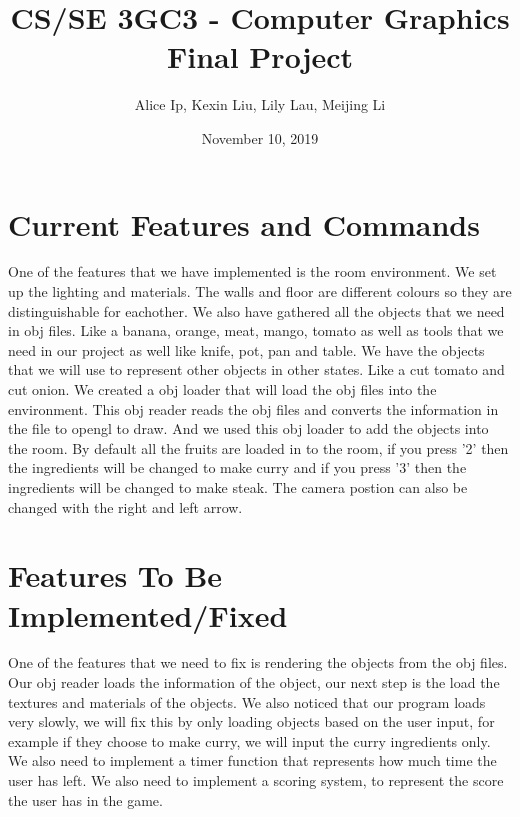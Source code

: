 \documentclass[11pt]{article}
\author{Alice Ip, Kexin Liu, Lily Lau, Meijing Li}
\date{November 10, 2019}
\title{CS/SE 3GC3 - Computer Graphics Final Project}
\begin{document}
\maketitle

\section*{Current Features and Commands}
\label{sec-1}
One of the features that we have implemented is the room environment. 
We set up the lighting and materials. The walls and floor are different colours so they are distinguishable for eachother.
We also have gathered all the objects that we need in obj files. Like a banana, orange, meat, mango, tomato as well as tools that we need in our project as well like knife, pot, pan and table.
We have the objects that we will use to represent other objects in other states. Like a cut tomato and cut onion.   
We created a obj loader that will load the obj files into the environment. This obj reader reads the obj files and converts the information in the file to opengl to draw. And we used this obj loader to add the objects into the room. 
By default all the fruits are loaded in to the room, if you press '2' then the ingredients will be changed to make curry and if you press '3' then the ingredients will be changed to make steak. 
The camera postion can also be changed with the right and left arrow. 

\section*{Features To Be Implemented/Fixed}
\label{sec-2}
One of the features that we need to fix is rendering the objects from the obj files. Our obj reader loads the information of the object, our next step is the load the textures and materials of the objects. 
We also noticed that our program loads very slowly, we will fix this by only loading objects based on the user input, for example if they choose to make curry, we will input the curry ingredients only. 
We also need to implement a timer function that represents how much time the user has left. We also need to implement a scoring system, to represent the score the user has in the game.
\end{document}
